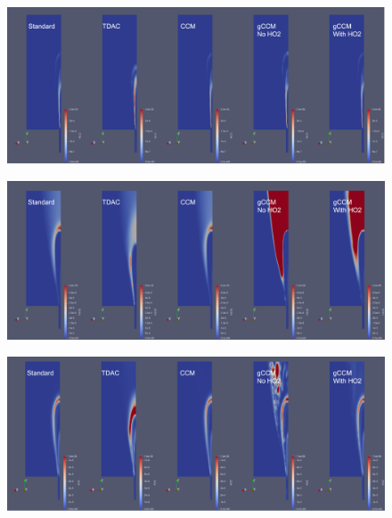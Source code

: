 \begin{figure}[H]
    \centering
    \includegraphics[width=0.95\linewidth]{figs/SandiaD/Screenshot from 2025-03-12 07-00-42.png}
    \label{fig:domain}
\end{figure}

\begin{figure}[H]
    \centering
    \includegraphics[width=0.95\linewidth]{figs/SandiaD/Screenshot from 2025-03-12 07-01-10.png}
    \label{fig:domain}
\end{figure}

\begin{figure}[H]
    \centering
    \includegraphics[width=0.95\linewidth]{figs/SandiaD/Screenshot from 2025-03-12 07-01-27.png}
    \label{fig:domain}
\end{figure}

